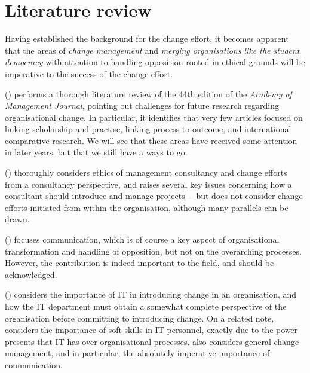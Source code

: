 \section{Literature review}

Having established the background for the change effort, it becomes apparent that the areas of \textit{change management} and \textit{merging organisations like the student democracy} with attention to handling opposition rooted in ethical grounds will be imperative to the success of the change effort.

\citeauthor{pettigrew-woodman-cameron:studying-organizational-change-and-development:2001} (\citeyear{pettigrew-woodman-cameron:studying-organizational-change-and-development:2001}) performs a thorough literature review of the 44th edition of the \textit{Academy of Management Journal}, pointing out challenges for future research regarding organisational change. In particular, it identifies that very few articles focused on linking scholarship and practise, linking process to outcome, and international comparative research. We will see that these areas have received some attention in later years, but that we still have a ways to go.

\citeauthor{o-mahoney-markham:management-consultancy:2013} (\citeyear{o-mahoney-markham:management-consultancy:2013}) thoroughly considers ethics of management consultancy and change efforts from a consultancy perspective, and raises several key issues concerning how a consultant should introduce and manage projects -- but does not consider change efforts initiated from within the organisation, although many parallels can be drawn.

\citeauthor{hargie:skilled-interpersonal-communication-research-theory-and-practice:2011} (\citeyear{hargie:skilled-interpersonal-communication-research-theory-and-practice:2011}) focuses communication, which is of course a key aspect of organisational transformation and handling of opposition, but not on the overarching processes. However, the contribution is indeed important to the field, and should be acknowledged.

\citeauthor{luftman:managing-the-information-technology-resource:2009} (\citeyear{luftman:managing-the-information-technology-resource:2009}) considers the importance of IT in introducing change in an organisation, and how the IT department must obtain a somewhat complete perspective of the organisation before committing to introducing change. On a related note, \autocite{joseph-ang-chang-slaughter:practical-intelligence-in-it:2010} considers the importance of soft skills in IT personnel, exactly due to the power \citeauthor{luftman:managing-the-information-technology-resource:2009} presents that IT has over organisational processes. \autocite{luftman:managing-the-information-technology-resource:2009} also considers general change management, and in particular, the absolutely imperative importance of communication.

